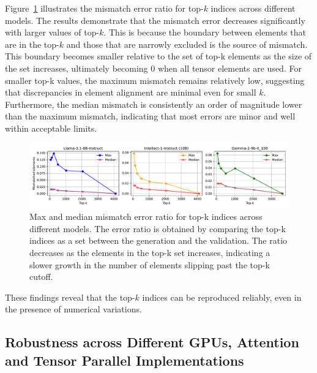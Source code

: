\documentclass{article}
\theoremstyle{plain}
\theoremstyle{definition}
\theoremstyle{remark}
\begin{document}
Figure~\ref{fig:mismatch_rate_topk} illustrates the mismatch error ratio for top-$k$ indices across different models.
The results demonstrate that the mismatch error decreases significantly with larger values of top-$k$.
This is because the boundary between elements that are in the top-$k$ and those that are narrowly excluded is the source of mismatch.
This boundary becomes smaller relative to the set of top-k elements as the size of the set increases, ultimately becoming 0 when all tensor elements are used.
For smaller top-k values, the maximum mismatch remains relatively low, suggesting that discrepancies in element alignment are minimal even for small $k$.
Furthermore, the median mismatch is consistently an order of magnitude lower than the maximum mismatch, indicating that most errors are minor and well within acceptable limits.

\begin{figure}[ht]
  \centerline{\includegraphics[width=\linewidth]{figures/median_mismatch_rate_topk.pdf}}
  \caption{Max and median mismatch error ratio for top-k indices across different models. The error ratio is obtained by comparing the top-k indices as a set between the generation and the validation. The ratio decreases as the elements in the top-k set increases, indicating a slower growth in the number of elements slipping past the top-k cutoff.}
  \label{fig:mismatch_rate_topk}
\end{figure}

These findings reveal that the top-$k$ indices can be reproduced reliably, even in the presence of numerical variations.

\subsection{Robustness across Different GPUs, Attention and Tensor Parallel Implementations}
\end{document}
